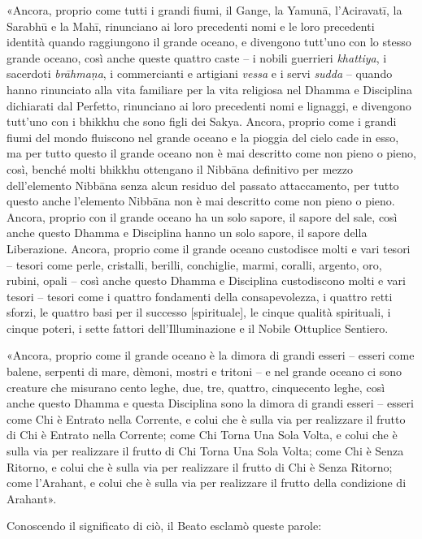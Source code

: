 «Ancora, proprio come tutti i grandi fiumi, il Gange, la Yamunā,
l’Aciravatī, la Sarabhū e la Mahī, rinunciano ai loro precedenti nomi e
le loro precedenti identità quando raggiungono il grande oceano, e
divengono tutt’uno con lo stesso grande oceano, così anche queste
quattro caste – i nobili guerrieri \emph{khattiya}, i sacerdoti \emph{brāhmaṇa}, i
commercianti e artigiani \emph{vessa} e i servi \emph{sudda} – quando hanno
rinunciato alla vita familiare per la vita religiosa nel Dhamma e
Disciplina dichiarati dal Perfetto, rinunciano ai loro precedenti nomi e
lignaggi, e divengono tutt’uno con i bhikkhu che sono figli dei Sakya.
Ancora, proprio come i grandi fiumi del mondo fluiscono nel grande
oceano e la pioggia del cielo cade in esso, ma per tutto questo il
grande oceano non è mai descritto come non pieno o pieno, così, benché
molti bhikkhu ottengano il Nibbāna definitivo per mezzo dell’elemento
Nibbāna senza alcun residuo del passato attaccamento, per tutto questo
anche l’elemento Nibbāna non è mai descritto come non pieno o pieno.
Ancora, proprio con il grande oceano ha un solo sapore, il sapore del
sale, così anche questo Dhamma e Disciplina hanno un solo sapore, il
sapore della Liberazione. Ancora, proprio come il grande oceano
custodisce molti e vari tesori – tesori come perle, cristalli, berilli,
conchiglie, marmi, coralli, argento, oro, rubini, opali – così anche
questo Dhamma e Disciplina custodiscono molti e vari tesori – tesori
come i quattro fondamenti della consapevolezza, i quattro retti sforzi,
le quattro basi per il successo [spirituale], le cinque qualità
spirituali, i cinque poteri, i sette fattori dell’Illuminazione e il
Nobile Ottuplice Sentiero.


«Ancora, proprio come il grande oceano è la dimora di grandi esseri –
esseri come balene, serpenti di mare, dèmoni, mostri e tritoni – e nel
grande oceano ci sono creature che misurano cento leghe, due, tre,
quattro, cinquecento leghe, così anche questo Dhamma e questa Disciplina
sono la dimora di grandi esseri – esseri come Chi è Entrato nella
Corrente, e colui che è sulla via per realizzare il frutto di Chi è
Entrato nella Corrente; come Chi Torna Una Sola Volta, e colui che è
sulla via per realizzare il frutto di Chi Torna Una Sola Volta; come Chi
è Senza Ritorno, e colui che è sulla via per realizzare il frutto di Chi
è Senza Ritorno; come l’Arahant, e colui che è sulla via per realizzare
il frutto della condizione di Arahant».


Conoscendo il significato di ciò, il Beato esclamò queste parole:



